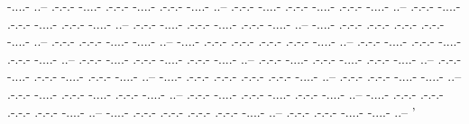 \documentclass[a4paper,11pt]{article}
\begin{document}
-....- ..-- .-.-.- -....- .-.-.- -....- .-.-.- -....- ..-- .-.-.- -....- .-.-.- -....- .-.-.- -....- ..-- .-.-.- -....- .-.-.- -....- .-.-.- -....- ..-- .-.-.- -....- .-.-.- -....- .-.-.- -....- ..-- -....- .-.-.- .-.-.- .-.-.- .-.-.- -....- ..-- .-.-.- .-.-.- -....- -....- ..-- -....- .-.-.- .-.-.- .-.-.- .-.-.- -....- ..-- .-.-.- -....- .-.-.- -....- .-.-.- -....- ..-- .-.-.- -....- .-.-.- -....- .-.-.- -....- ..-- .-.-.- -....- .-.-.- -....- .-.-.- -....- ..-- .-.-.- -....- .-.-.- -....- .-.-.- -....- ..-- -....- .-.-.- .-.-.- .-.-.- .-.-.- -....- ..-- .-.-.- .-.-.- -....- -....- ..-- .-.-.- -....- .-.-.- -....- .-.-.- -....- ..-- .-.-.- -....- .-.-.- -....- .-.-.- -....- ..-- -....- .-.-.- .-.-.- .-.-.- .-.-.- -....- ..-- -....- .-.-.- .-.-.- .-.-.- .-.-.- -....- ..-- .-.-.- .-.-.- -....- -....- ..-- '
\end{document}
